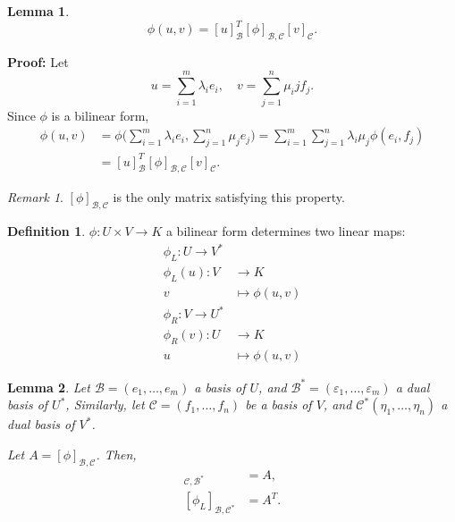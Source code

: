 \documentclass[12pt]{article}
\newtheorem{lemma}{Lemma}[section]
\theoremstyle{definition}
\newtheorem{definition}{Definition}[section]
\theoremstyle{remark}
\newtheorem*{remark}{Remark}
\begin{document}
\begin{lemma}
	\[
		\phi(u, v) = [u]_{\mathcal{B}}^{T} [\phi]_{\mathcal{B}, \mathcal{C}} [v]_{\mathcal{C}}
	.\]
\end{lemma}

\begin{adjustbox}{minipage = \columnwidth - 25.5pt, margin=1em, frame=1pt, margin=0em}
\textbf{Proof:} Let
\[
u = \sum_{i = 1}^{m} \lambda_i e_i, \quad v = \sum_{j = 1}^{n} \mu_ij f_j
.\]
Since $\phi$ is a bilinear form,
\begin{align*}
	\phi(u, v) &= \phi \Biggl( \sum_{i = 1}^{m} \lambda_i e_i, \sum_{j = 1}^{n} \mu_j e_j \Biggr) = \sum_{i = 1}^{m}\sum_{j = 1}^{n} \lambda_i \mu_j \phi(e_i, f_j) \\
		   &= [u]_{\mathcal{B}}^{T}[\phi]_{\mathcal{B}, \mathcal{C}}[v]_{\mathcal{C}}.
\end{align*}
\end{adjustbox}

\begin{remark}
	$[\phi]_{\mathcal{B},\mathcal{C}}$ is the only matrix satisfying this property.
\end{remark}

\begin{definition}
	$\phi: U \times V \to K$ a bilinear form determines two linear maps:
	\begin{align*}
		\phi_L : U \to V^{\ast}& \\
		\phi_L(u) : V &\to K \\
			      v &\mapsto \phi(u, v)\\
			      \phi_R : V \to U^{\ast}& \\
			      \phi_R(v) : U &\to K \\
			      u &\mapsto \phi(u, v)
	\end{align*}
\end{definition}

\begin{lemma}
	Let $\mathcal{B} = (e_1, \ldots, e_m)$ a basis of $U$, and $\mathcal{B}^{\ast} = (\varepsilon_1, \ldots, \varepsilon_m)$ a dual basis of $U^{\ast}$, Similarly, let $\mathcal{C} = (f_1, \ldots, f_n)$ be a basis of $V$, and $\mathcal{C}^{\ast} (\eta_1, \ldots, \eta_n)$ a dual basis of $V^{\ast}$.

	Let $A = [\phi]_{\mathcal{B}, \mathcal{C}}$. Then,
	\begin{align*}
		[\phi_R]_{\mathcal{C}, \mathcal{B}^{\ast}} &= A, \\
		[\phi_L]_{\mathcal{B}, \mathcal{C}^{\ast}} &= A^{T}.
	\end{align*}
\end{lemma}
\end{document}
